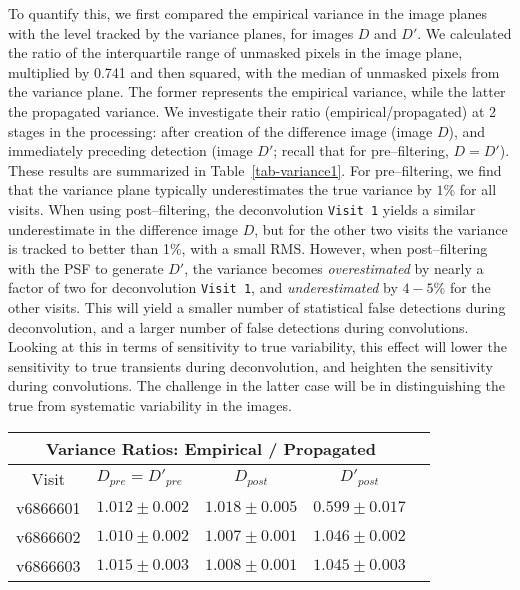\documentclass[iop]{emulateapj}
\begin{document}
To quantify this, we first compared the empirical variance in the image planes with the level tracked by the variance planes, for images $D$ and $D'$.
We calculated the ratio of the interquartile range of unmasked pixels in the image plane, multiplied by 0.741 and then squared, with the median of unmasked pixels from the variance plane.
The former represents the empirical variance, while the latter the propagated variance.
We investigate their ratio (empirical/propagated) at 2 stages in the processing: after creation of the difference image (image $D$), and immediately preceding detection (image $D'$; recall that for pre--filtering, $D = D'$).
These results are summarized in Table~\ref{tab-variance1}.
For pre--filtering, we find that the variance plane typically underestimates the true variance by $1\%$ for all visits.
When using post--filtering, the deconvolution {\tt Visit 1} yields a similar underestimate in the difference image $D$, but for the other two visits the variance is tracked to better than 1\%, with a small RMS.
However, when post--filtering with the PSF to generate $D'$, the variance becomes {\it overestimated} by nearly a factor of two for deconvolution {\tt Visit 1}, and {\it underestimated} by $4-5\%$ for the other visits.
This will yield a smaller number of statistical false detections during deconvolution, and a larger number of false detections during convolutions.
Looking at this in terms of sensitivity to true variability, this effect will lower the sensitivity to true transients during deconvolution, and heighten the sensitivity during convolutions.
The challenge in the latter case will be in distinguishing the true from systematic variability in the images.

\begin{table*}[t]
\centering
\begin{tabular}{clccc}
\hline
\multicolumn{4}{|c|}{Variance Ratios: Empirical / Propagated} \\
\hline
Visit    & $D_{pre} = D'_{pre}$ & $D_{post}$ & $D'_{post}$ \\
\hline
v6866601 &$1.012 \pm 0.002$&$1.018 \pm 0.005$&$0.599 \pm 0.017$ \\
v6866602 &$1.010 \pm 0.002$&$1.007 \pm 0.001$&$1.046 \pm 0.002$ \\
v6866603 &$1.015 \pm 0.003$&$1.008 \pm 0.001$&$1.045 \pm 0.003$ \\
\end{tabular}
\caption{{\rm This intra--image comparison gives the ratio of the empirical variance in the image--plane pixels to the median of the variance--plane pixels.
  In all cases (except the deconvolution configuration) the variance plane represents an {\it underestimate} of the true variance in the images.
  We report the mean and RMS across all sensors.
\label{tab-variance1}}}
\end{table*}
\end{document}
